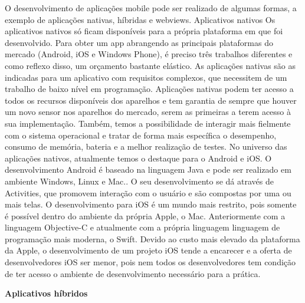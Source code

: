 O desenvolvimento de aplicações mobile pode ser realizado de algumas formas, a exemplo  de aplicações nativas, híbridas e webviews. 
Aplicativos nativos
Os aplicativos nativos só ficam disponíveis para a própria plataforma em que foi desenvolvido. Para obter um app abrangendo as principais plataformas do mercado (Android, iOS e Windows Phone), é preciso três trabalhos diferentes e como reflexo disso, um orçamento bastante elástico.
As aplicações nativas são as indicadas para um aplicativo com requisitos complexos, que necessitem de um trabalho de baixo nível em programação. Aplicações nativas podem ter acesso a todos os recursos disponíveis dos aparelhos e tem garantia de sempre que houver um novo sensor nos aparelhos do mercado, serem as primeiras a terem acesso à sua implementação. Também, temos a possibilidade de interagir mais fielmente com o sistema operacional e tratar de forma mais específica o desempenho, consumo de memória, bateria e a melhor realização de testes.
No universo das aplicações nativos, atualmente temos o destaque para o Android e iOS. O desenvolvimento Android é baseado na linguagem Java e pode ser realizado em ambiente Windows, Linux e Mac.. O seu desenvolvimento se dá através de Activities, que promovem interação com o usuário e são compostas por uma ou mais telas.
O desenvolvimento para iOS é um mundo mais restrito, pois somente é possível dentro do ambiente da própria Apple, o Mac. Anteriormente com a linguagem Objective-C e atualmente com a própria linguagem linguagem de programação mais moderna, o Swift. Devido ao custo  mais elevado da plataforma da Apple, o desenvolvimento de um projeto iOS tende a encarecer e a oferta de desenvolvedores iOS ser menor, pois nem todos os desenvolvedores tem condição de ter acesso o ambiente de desenvolvimento necessário para a prática.

\textbf{Aplicativos híbridos}

